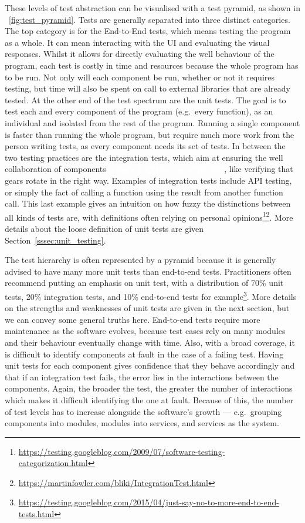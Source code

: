 \documentclass[11pt]{sdm_internship}
\newcommand{\rephrase}[1]{\colorbox{BlueViolet!60}{\textcolor{white}{\textbf{$\sim$#1}}}}
\theoremstyle{definition}
\begin{document}
These levels of test abstraction can be visualised with a test pyramid, as shown in \figurename~\ref{fig:test_pyramid}.
Tests are generally separated into three distinct categories.
The top category is for the End-to-End tests, which means testing the program as a whole.
It can mean interacting with the UI and evaluating the visual responses.
Whilst it allows for directly evaluating the well behaviour of the program, each test is costly in time and resources because the whole program has to be run.
Not only will each component be run, whether or not it requires testing, but time will also be spent on call to external libraries that are already tested.
At the other end of the test spectrum are the unit tests.
The goal is to test each and every component of the program (e.g.\ every function), as an individual and isolated from the rest of the program.
Running a single component is faster than running the whole program, but require much more work from the person writing tests, as every component needs its set of tests.
In between the two testing practices are the integration tests, which aim at ensuring the well collaboration of components \rephrase{work together as expected}, like verifying that gears rotate in the right way.
Examples of integration tests include API testing, or simply the fact of calling a function using the result from another function call.
This last example gives an intuition on how fuzzy the distinctions between all kinds of tests are, with definitions often relying on personal opinions\footnote{\url{https://testing.googleblog.com/2009/07/software-testing-categorization.html}}\footnote{\url{https://martinfowler.com/bliki/IntegrationTest.html}}.
More details about the loose definition of unit tests are given Section~\ref{sssec:unit_testing}.

The test hierarchy is often represented by a pyramid because it is generally advised to have many more unit tests than end-to-end tests.
Practitioners often recommend putting an emphasis on unit test, with a distribution of 70\% unit tests, 20\% integration tests, and 10\% end-to-end tests for example\footnote{\url{https://testing.googleblog.com/2015/04/just-say-no-to-more-end-to-end-tests.html}}.
More details on the strengths and weaknesses of unit tests are given in the next section, but we can convey some general truths here.
End-to-end tests require more maintenance as the software evolves, because test cases rely on many modules and their behaviour eventually change with time.
Also, with a broad coverage, it is difficult to identify components at fault in the case of a failing test.
Having unit tests for each component gives confidence that they behave accordingly and that if an integration test fails, the error lies in the interactions between the components.
Again, the broader the test, the greater the number of interactions which makes it difficult identifying the one at fault.
Because of this, the number of test levels has to increase alongside the software's growth --- e.g.\ grouping components into modules, modules into services, and services as the system.
\end{document}
